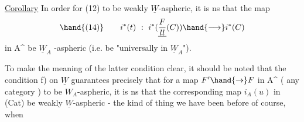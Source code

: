 \uline{Corollary} In order for (12) to be weakly $\underline{W}$-aspheric, it is ns that
the map
\[ \hand{(14)} \qquad i^{*}(t)\ :\ i^{*}(\underline{F\over{l}{l}}(C))\hand{\longrightarrow} i^{*}(C) \]
in A\^{} be $\underline{W}_A$ -aspheric (i.e. be "universally in $\underline{W}_A$").

To make the meaning of the latter condition clear, it should be
noted that the condition f) on $\underline{W}$ guarantees precisely that for a
map $F'\hand{\to} F$ in A\^{} ( any category  ) to be  $W_A$-aspheric, it is
ns that the corresponding map $i_A(u)$ in (Cat) be weakly $\underline{W}$-aspheric -
the kind of thing we have been  before of course, when

